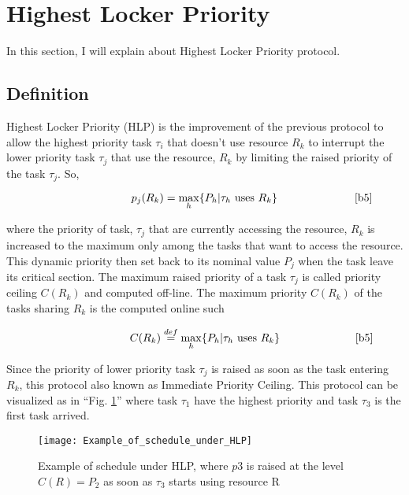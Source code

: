 \section{Highest Locker Priority}
In this section, I will explain about Highest Locker Priority protocol.

\subsection{Definition}

Highest Locker Priority (HLP) is the improvement of the previous protocol to allow the highest priority task $\tau_{i}$ that doesn't use resource $R_{k}$ to interrupt the lower priority task $\tau_{j}$ that use the resource, $R_{k}$ by limiting the raised priority of the task $\tau_{j}$. So, 
 
\begin{equation}
   \citeequation{p_{j}(R_{k})=\underset{h}{\mathrm{max}} \{P_{h}| \tau_{h} \text{   uses } R_{k}\}}{b5}\label{eq1}
\end{equation}

where the priority of task, $\tau_{j}$ that are currently accessing the resource, $R_{k}$ is increased to the maximum only among the tasks that want to access the resource. This dynamic priority then set back to its nominal value $P_{j}$ when the task leave its critical section. The maximum raised priority of a task $\tau_{j}$ is called priority ceiling $ C(R_{k}) $ and computed off-line.  The maximum priority $ C(R_{k}) $ of the tasks sharing $ R_{k} $ is the computed online such

\begin{equation}
\citeequation{C(R_{k})\stackrel{def}{=}\underset{h}{\mathrm{max}} \{P_{h}| \tau_{h}\text{  uses }  R_{k}\}}{b5}\label{eq2}
\end{equation}

Since the priority of lower priority task $\tau_{j}$ is raised as soon as the task entering $ R_{k} $, this protocol also known as Immediate Priority Ceiling. This protocol can be visualized as in  ``Fig. \ref{fig:Example_of_schedule_under_HLP}'' where task $ \tau_{1} $ have the highest priority and task $ \tau_{3} $ is the first task arrived.

\begin{figure}[ht]
    \centering
    \texttt{[image: Example\_of\_schedule\_under\_HLP]}
    \caption{ Example of schedule under HLP, where $ p3 $ is raised at the level $ C(R) = P_{2} $ as soon as $ \tau_{3} $ starts using resource R \cite{b5}}
    \label{fig:Example_of_schedule_under_HLP}
\end{figure}

